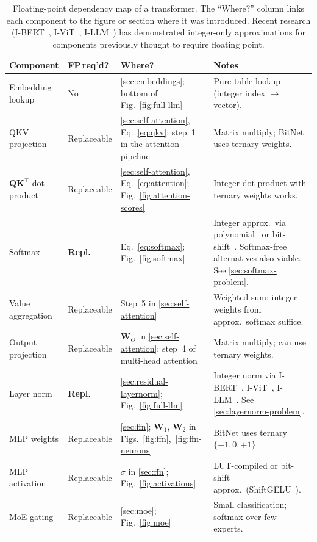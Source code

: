 \begin{table}[htbp]
\centering
\small
\caption{Floating-point dependency map of a transformer. The
  ``Where?'' column links each component to the figure or section
  where it was introduced. Recent research
  (I-BERT~\cite{kim2021ibert}, I-ViT~\cite{li2022ivit},
  I-LLM~\cite{hu2024illm}) has demonstrated integer-only
  approximations for components previously thought to require
  floating point.}
\label{tab:fp-map}
\begin{tabular}{@{}p{2.6cm}p{1.8cm}p{2.5cm}p{5.2cm}@{}}
  \toprule
  \textbf{Component} & \textbf{FP\,req'd?} & \textbf{Where?} & \textbf{Notes} \\
  \midrule
  Embedding lookup
    & No
    & \cref{sec:embeddings}; bottom of Fig.~\ref{fig:full-llm}
    & Pure table lookup (integer index $\to$ vector). \\[4pt]
  QKV projection
    & Replaceable
    & \cref{sec:self-attention}, Eq.~\ref{eq:qkv}; step~1 in the attention pipeline
    & Matrix multiply; BitNet uses ternary weights. \\[4pt]
  $\bm{Q}\bm{K}^\top$ dot product
    & Replaceable
    & \cref{sec:self-attention}, Eq.~\ref{eq:attention}; Fig.~\ref{fig:attention-scores}
    & Integer dot product with ternary weights works. \\[4pt]
  Softmax
    & \textbf{Repl.}
    & Eq.~\ref{eq:softmax}; Fig.~\ref{fig:softmax}
    & Integer approx.\ via polynomial~\cite{kim2021ibert} or
      bit-shift~\cite{li2022ivit}. Softmax-free alternatives
      also viable. See \cref{sec:softmax-problem}. \\[4pt]
  Value aggregation
    & Replaceable
    & Step~5 in \cref{sec:self-attention}
    & Weighted sum; integer weights from approx.\ softmax suffice. \\[4pt]
  Output projection
    & Replaceable
    & $\bm{W}_O$ in \cref{sec:self-attention}; step~4 of multi-head attention
    & Matrix multiply; can use ternary weights. \\[4pt]
  Layer norm
    & \textbf{Repl.}
    & \cref{sec:residual-layernorm}; Fig.~\ref{fig:full-llm}
    & Integer norm via I-BERT~\cite{kim2021ibert},
      I-ViT~\cite{li2022ivit}, I-LLM~\cite{hu2024illm}.
      See \cref{sec:layernorm-problem}. \\[4pt]
  MLP weights
    & Replaceable
    & \cref{sec:ffn}; $\bm{W}_1$, $\bm{W}_2$ in
      Figs.~\ref{fig:ffn},~\ref{fig:ffn-neurons}
    & BitNet uses ternary $\{-1,0,+1\}$. \\[4pt]
  MLP activation
    & Replaceable
    & $\sigma$ in \cref{sec:ffn}; Fig.~\ref{fig:activations}
    & LUT-compiled or bit-shift approx.\
      (ShiftGELU~\cite{li2022ivit}). \\[4pt]
  MoE gating
    & Replaceable
    & \cref{sec:moe}; Fig.~\ref{fig:moe}
    & Small classification; softmax over few experts. \\
  \bottomrule
\end{tabular}
\end{table}

